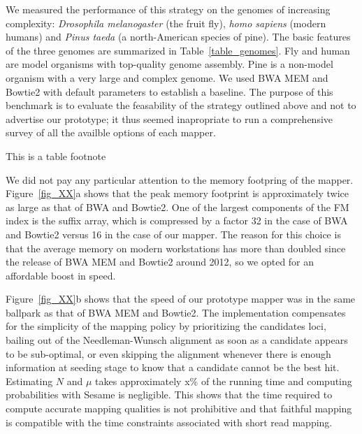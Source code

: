 \documentclass[a4,center,fleqn]{NAR}
\begin{document}
We measured the performance of this strategy on the genomes of increasing
complexity: \textit{Drosophila melanogaster} (the fruit fly), \textit{homo
sapiens} (modern humans) and \textit{Pinus taeda} (a north-American
species of pine). The basic features of the three genomes are summarized
in Table~\ref{table_genomes}. Fly and human are model organisms with
top-quality genome assembly. Pine is a non-model organism with a very
large and complex genome. We used BWA MEM and Bowtie2 with default
parameters to establish a baseline. The purpose of this benchmark is to
evaluate the feasability of the strategy outlined above and not to
advertise our prototype; it thus seemed inapropriate to run a
comprehensive survey of all the availble options of each mapper.

\begin{table}[b]
{This is a table footnote}
\end{table}

We did not pay any particular attention to the memory footpring of the
mapper. Figure~\ref{fig_XX}a shows that the peak memory footprint is
approximately twice as large as that of BWA and Bowtie2. One of the
largest components of the FM index is the suffix array, which is
compressed by a factor 32 in the case of BWA and Bowtie2 versus 16 in the
case of our mapper. The reason for this choice is that the average memory
on modern workstations has more than doubled since the release of BWA MEM
and Bowtie2 around 2012, so we opted for an affordable boost in speed.

Figure~\ref{fig_XX}b shows that the speed of our prototype mapper was in
the same ballpark as that of BWA MEM and Bowtie2. The implementation
compensates for the simplicity of the mapping policy by prioritizing the
candidates loci, bailing out of the Needleman-Wunsch alignment as soon as
a candidate appears to be sub-optimal, or even skipping the alignment
whenever there is enough information at seeding stage to know that a
candidate cannot be the best hit. Estimating $N$ and $\mu$ takes
approximately x\% of the running time and computing probabilities with
Sesame is negligible. This shows that the time required to compute
accurate mapping qualities is not prohibitive and that faithful mapping is
compatible with the time constraints associated with short read mapping.
\end{document}
